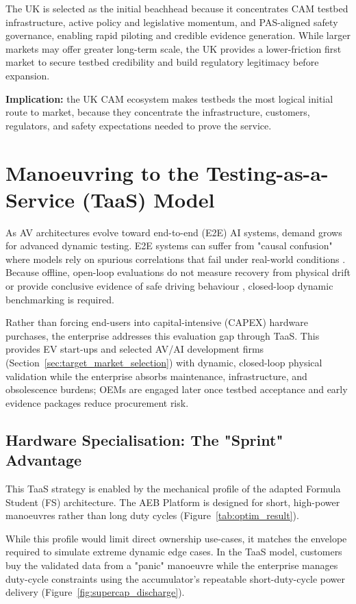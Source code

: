 \documentclass[11pt, a4paper]{report}
\numberwithin{equation}{section}
\begin{document}
\begin{refsection}
The UK is selected as the initial beachhead because it concentrates CAM testbed infrastructure, active policy and legislative momentum, and PAS-aligned safety governance, enabling rapid piloting and credible evidence generation. While larger markets may offer greater long-term scale, the UK provides a lower-friction first market to secure testbed credibility and build regulatory legitimacy before expansion.

\noindent\textbf{Implication:} the UK CAM ecosystem makes testbeds the most logical initial route to market, because they concentrate the infrastructure, customers, regulators, and safety expectations needed to prove the service.

\section{Manoeuvring to the Testing-as-a-Service (TaaS) Model}

As AV architectures evolve toward end-to-end (E2E) AI systems, demand grows for advanced dynamic testing. E2E systems can suffer from "causal confusion" where models rely on spurious correlations that fail under real-world conditions \cite[p.~11--12]{chen_2024}. Because offline, open-loop evaluations do not measure recovery from physical drift or provide conclusive evidence of safe driving behaviour \cite[p.~7]{chen_2024}, closed-loop dynamic benchmarking is required.

Rather than forcing end-users into capital-intensive (CAPEX) hardware purchases, the enterprise addresses this evaluation gap through TaaS. This provides EV start-ups and selected AV/AI development firms (Section~\ref{sec:target_market_selection}) with dynamic, closed-loop physical validation while the enterprise absorbs maintenance, infrastructure, and obsolescence burdens; OEMs are engaged later once testbed acceptance and early evidence packages reduce procurement risk.

\subsection{Hardware Specialisation: The "Sprint" Advantage}
\label{sec:sprint}
\label{sec:ch7-sprint-advantage}
This TaaS strategy is enabled by the mechanical profile of the adapted Formula Student (FS) architecture. The AEB Platform is designed for short, high-power manoeuvres rather than long duty cycles (Figure~\ref{tab:optim_result}).

While this profile would limit direct ownership use-cases, it matches the envelope required to simulate extreme dynamic edge cases. In the TaaS model, customers buy the validated data from a "panic" manoeuvre while the enterprise manages duty-cycle constraints using the accumulator's repeatable short-duty-cycle power delivery (Figure~\ref{fig:supercap_discharge}).


\end{refsection}
\end{document}
